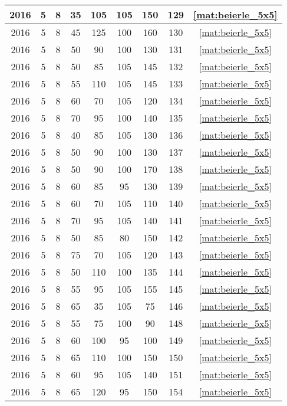\begin{longtable}{|c|c|c|c|c|c|c|c|c|}
2016 & 5 & 8 & 35 & 105 & 105 & 150 & 129 & \eqref{mat:beierle_5x5} \\ \hline 
2016 & 5 & 8 & 45 & 125 & 100 & 160 & 130 & \eqref{mat:beierle_5x5} \\ \hline 
2016 & 5 & 8 & 50 & 90 & 100 & 130 & 131 & \eqref{mat:beierle_5x5} \\ \hline 
2016 & 5 & 8 & 50 & 85 & 105 & 145 & 132 & \eqref{mat:beierle_5x5} \\ \hline 
2016 & 5 & 8 & 55 & 110 & 105 & 145 & 133 & \eqref{mat:beierle_5x5} \\ \hline 
2016 & 5 & 8 & 60 & 70 & 105 & 120 & 134 & \eqref{mat:beierle_5x5} \\ \hline 
2016 & 5 & 8 & 70 & 95 & 100 & 140 & 135 & \eqref{mat:beierle_5x5} \\ \hline 
2016 & 5 & 8 & 40 & 85 & 105 & 130 & 136 & \eqref{mat:beierle_5x5} \\ \hline 
2016 & 5 & 8 & 50 & 90 & 100 & 130 & 137 & \eqref{mat:beierle_5x5} \\ \hline 
2016 & 5 & 8 & 50 & 90 & 100 & 170 & 138 & \eqref{mat:beierle_5x5} \\ \hline 
2016 & 5 & 8 & 60 & 85 & 95 & 130 & 139 & \eqref{mat:beierle_5x5} \\ \hline 
2016 & 5 & 8 & 60 & 70 & 105 & 110 & 140 & \eqref{mat:beierle_5x5} \\ \hline 
2016 & 5 & 8 & 70 & 95 & 105 & 140 & 141 & \eqref{mat:beierle_5x5} \\ \hline 
2016 & 5 & 8 & 50 & 85 & 80 & 150 & 142 & \eqref{mat:beierle_5x5} \\ \hline 
2016 & 5 & 8 & 75 & 70 & 105 & 120 & 143 & \eqref{mat:beierle_5x5} \\ \hline 
2016 & 5 & 8 & 50 & 110 & 100 & 135 & 144 & \eqref{mat:beierle_5x5} \\ \hline 
2016 & 5 & 8 & 55 & 95 & 105 & 155 & 145 & \eqref{mat:beierle_5x5} \\ \hline 
2016 & 5 & 8 & 65 & 35 & 105 & 75 & 146 & \eqref{mat:beierle_5x5} \\ \hline 
2016 & 5 & 8 & 55 & 75 & 100 & 90 & 148 & \eqref{mat:beierle_5x5} \\ \hline 
2016 & 5 & 8 & 60 & 100 & 95 & 100 & 149 & \eqref{mat:beierle_5x5} \\ \hline 
2016 & 5 & 8 & 65 & 110 & 100 & 150 & 150 & \eqref{mat:beierle_5x5} \\ \hline 
2016 & 5 & 8 & 60 & 95 & 105 & 140 & 151 & \eqref{mat:beierle_5x5} \\ \hline 
2016 & 5 & 8 & 65 & 120 & 95 & 150 & 154 & \eqref{mat:beierle_5x5} \\ \hline 

\end{longtable}
